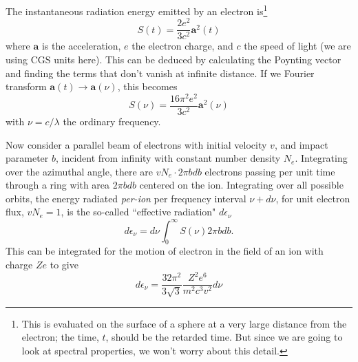 \documentclass[prb,aps,nofootinbib,superscriptaddress,floatfix]{revtex4-2}
\begin{document}
The instantaneous radiation energy emitted by an electron is\footnote{This is evaluated on the surface of a sphere at a very large distance from the electron; the time, $t$, should be the retarded time. But since we are going to look at spectral properties, we won't worry about this detail.} \cite{zel2002physics,griffiths2005introduction}
\begin{equation}
    S(t)=\frac{2e^2}{3c^2}\bm{a}^2(t)
\end{equation}
where $\bm{a}$ is the acceleration, $e$ the electron charge, and $c$ the speed of light (we are using CGS units here). This can be deduced by calculating the Poynting vector and finding the terms that don't vanish at infinite distance. If we Fourier transform $\bm{a}(t) \rightarrow \bm{a}(\nu)$, this becomes
\begin{equation}
    S(\nu)=\frac{16 \pi^2 e^2}{3c^2}\bm{a}^2(\nu)
\end{equation}
with $\nu=c/\lambda$ the ordinary frequency.

Now consider a parallel beam of electrons with initial velocity $v$, and impact parameter $b$, incident from infinity with constant number density $N_e$. Integrating over the azimuthal angle, there are $v N_e \cdot  2\pi b db$ electrons passing per unit time through a ring with area $2\pi b db$ centered on the ion. Integrating over all possible orbits, the energy radiated \emph{per-ion} per frequency interval $\nu+d\nu$, for unit electron flux, $v N_e=1$, is the so-called ``effective radiation" $d\epsilon_\nu$ \cite{zel2002physics} 
\begin{equation}
    d\epsilon_\nu = d\nu \int_0^\infty S(\nu) 2 \pi b db.
    \label{eq:effective_radiation}
\end{equation}
This can be integrated for the motion of electron in the field of an ion with charge $Ze$ to give \cite{zel2002physics,landau2013classical}
\begin{equation}
    d\epsilon_\nu = \frac{32 \pi^2 }{3 \sqrt{3}} \frac{Z^2e^6}{m^2 c^3 v^2} d\nu
    \label{eq:effective_radiation_2}
\end{equation}
\end{document}
